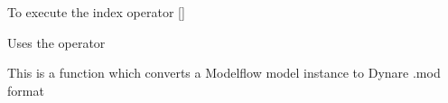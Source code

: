 \documentclass[letterpaper,10pt,english]{sphinxmanual}
\begin{document}
\begin{fulllineitems}
\begin{fulllineitems}
\end{fulllineitems}


\begin{fulllineitems}
\label{\detokenize{index:modelclass.Org_model_Mixin.__getitem__}}
\pysigstartsignatures
{}
\pysigstopsignatures
\sphinxAtStartPar
To execute the index operator {[}{]}

\sphinxAtStartPar
Uses the {\hyperref[\detokenize{index:modelvis.vis}]{}} operator

\end{fulllineitems}


\begin{fulllineitems}
\label{\detokenize{index:modelclass.Org_model_Mixin.todynare}}
\pysigstartsignatures
{}
\pysigstopsignatures
\sphinxAtStartPar
This is a function which converts a Modelflow  model instance to Dynare .mod format

\end{fulllineitems}


\end{fulllineitems}

\end{document}

